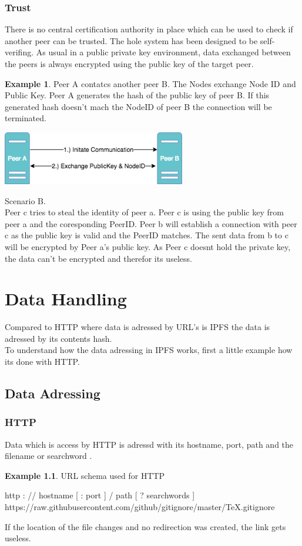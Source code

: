 \documentclass[a4paper,11pt, oneside]{report}
\theoremstyle{definition}
\newtheorem{exmp}{Example}[subsection]
\begin{document}
\subsection{Trust}
There is no central certification authority in place which can be used to check if another peer can be trusted. The hole system has been designed to be self-verifing. As usual in a public private key environment, data exchanged between the peers is always encrypted using the public key of the target peer.
\begin{exmp}
Peer A contatcs another peer B. The Nodes exchange Node ID and Public Key.
Peer A generates the hash of the public key of peer B. If this generated hash doesn't mach the NodeID of peer B the connection will be terminated.\\
\begin{center}
\includegraphics[width=0.6\textwidth]{img/ipfs_peerstrust_scenario_a.png}
\end{center}
\end{exmp}

\newpage
Scenario B. \\
Peer c tries to steal the identity of peer a. Peer c is using the public key from peer a and the coresponding PeerID. Peer b will establish a connection with peer c as the public key is valid and the PeerID matches. The sent data from b to c will be encrypted by Peer a's public key. As Peer c doesnt hold the private key, the data can't be encrypted and therefor its useless.
 

\chapter{Data Handling}
Compared to HTTP where data is adressed by URL's is IPFS the data is adressed by its contents hash.\\
To understand how the data adressing in IPFS works, first a little example how its done with HTTP.
\section{Data Adressing}
\subsection{HTTP}
Data which is access by HTTP is adressd with its hostname, port, path and the filename or searchword \cite{HTTPAdressing}.
\begin{exmp} URL schema used for HTTP
\noindent
\begin{center}
http : // hostname [ : port ] / path [ ? searchwords ]\\
https://raw.githubusercontent.com/github/gitignore/master/TeX.gitignore
\end{center}
\end{exmp}
\noindent
If the location of the file changes and no redirection was created, the link gets useless.
\noindent
\end{document}
